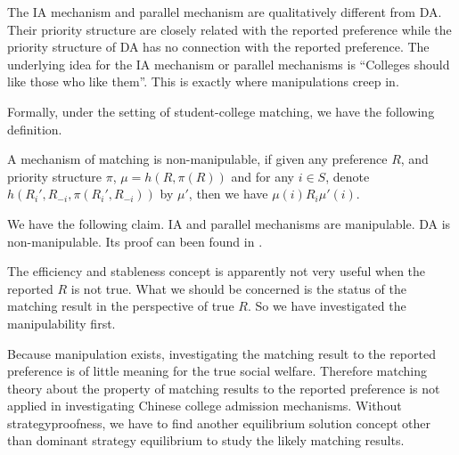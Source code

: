 The IA mechanism and parallel mechanism are qualitatively different from DA. Their
priority structure are closely related with the reported preference
while the priority structure of DA has no connection with the reported
preference. The underlying idea for the IA mechanism or parallel mechanisms is
``Colleges should like those who like them''.  This is exactly where manipulations creep
in.  

Formally, under the setting of student-college matching, we have the following definition.

\begin{definition}
A mechanism of matching is non-manipulable, if given any preference
$R$, and priority structure $\pi$, $\mu = h(R, \pi(R))$ and for any $i
\in S$, denote $h(R_i',R_{-i}, \pi(R_i',R_{-i}))$ by $\mu'$, then we have $\mu(i)R_i \mu'(i)$.
\end{definition}

We have the following claim.
IA and parallel mechanisms are manipulable. DA is non-manipulable.
Its proof can been found in \parencite{YanChenJPE}.
 
\begin{remark}
The efficiency and stableness concept is apparently not very useful when
the reported $R$ is not true. What we should be concerned is the status of the matching
result in the perspective of true $R$. So we have investigated the manipulability first.
\end{remark}

Because manipulation exists, investigating the matching result to the reported preference is of little meaning for the true social welfare. Therefore matching theory about the property of matching results to the reported preference is not applied in investigating Chinese college admission mechanisms. Without strategyproofness, we have to find another equilibrium solution concept other than dominant strategy equilibrium to study the likely matching results.

